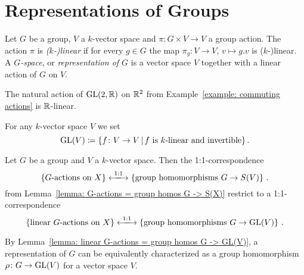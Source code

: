 \section{Representations of Groups}


\begin{definition}
  Let $G$ be a group, $V$ a $k$-vector space and $\pi \colon G \times V \to V$ a group action.
  The action $\pi$ is \emph{\textup($k$-\textup)linear} if for every $g \in G$ the map $\pi_g \colon V \to V$, $v \mapsto g.v$ is ($k$-)linear.
  A \emph{$G$-space}, or \emph{representation of $G$} is a vector space $V$ together with a linear action of $G$ on $V$.
\end{definition}


\begin{example}
  The natural action of $\operatorname{GL}(2,\mathbb{R})$ on $\mathbb{R}^2$ from Example~\ref{example: commuting actions} is $\mathbb{R}$-linear.
\end{example}


\begin{notation}
  For any $k$-vector space $V$ we set
  \[
              \GL(V)
    \defined  \{
                f \colon V \to V
              \suchthat
                \text{$f$ is $k$-linear and invertible}
              \} \,.
  \]
\end{notation}


\begin{lemma}
  \label{lemma: linear G-actions = group homos G -> GL(V)}
  Let $G$ be a group and $V$ a $k$-vector space.
  Then the 1:1-correspondence
  \[
    \left\{
      \text{$G$-actions on $X$}
    \right\}
    \xlongleftrightarrow{1:1}
    \left\{
      \text{group homomorphisms $G \to S(V)$}
    \right\} \,.
  \]
  from Lemma~\ref{lemma: G-actions = group homos G -> S(X)} restrict to a 1:1-correspondence
  \[
    \left\{
      \text{linear $G$-actions on $X$}
    \right\}
    \xlongleftrightarrow{1:1}
    \left\{
      \text{group homomorphisms $G \to \GL(V)$}
    \right\} \,.
  \]
\end{lemma}


\begin{remark}
  By Lemma~\ref{lemma: linear G-actions = group homos G -> GL(V)}, a representation of $G$ can be equivalently characterized as a group homomorphism $\rho \colon G \to \operatorname{GL}(V)$ for a vector space $V$.
\end{remark}


